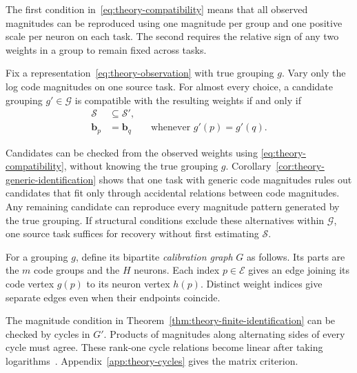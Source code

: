The first condition in~\eqref{eq:theory-compatibility} means that
all observed magnitudes can be reproduced using one magnitude per
group and one positive scale per neuron on each task. The second
requires the relative sign of any two weights in a group to remain
fixed across tasks.

\begin{corollary}
    \label{cor:theory-generic-identification}
    Fix a representation~\eqref{eq:theory-observation} with true
    grouping $g$. Vary only the log code magnitudes on
    one source task. For almost every choice, a candidate grouping
    $g'\in\mathcal G$ is compatible with the resulting weights
    if and only if
    \begin{equation*}
        \begin{aligned}
            \mathcal S&\subseteq\mathcal S',\\
            \mathbf b_p&=\mathbf b_q
                \qquad\text{whenever }g'(p)=g'(q).
        \end{aligned}
    \end{equation*}
\end{corollary}

Candidates can be checked from the observed weights using
\eqref{eq:theory-compatibility}, without knowing the true grouping
$g$. Corollary~\ref{cor:theory-generic-identification}
shows that one task with generic code magnitudes rules out
candidates that fit only through accidental relations between
code magnitudes. Any remaining candidate can reproduce every
magnitude pattern generated by the true grouping.
If structural conditions exclude these alternatives within
$\mathcal G$, one source task suffices for recovery without
first estimating $\mathcal S$.

For a grouping $g$, define its bipartite
\emph{calibration graph} $G$ as follows.
Its parts are the $m$ code groups and the $H$ neurons.
Each index $p\in\mathcal E$ gives an edge joining its code vertex
$g(p)$ to its neuron vertex $h(p)$.
Distinct weight indices give separate edges even when their endpoints
coincide.

The magnitude condition in Theorem~\ref{thm:theory-finite-identification}
can be checked by cycles in $G'$.
Products of magnitudes along alternating sides of every cycle must
agree. These rank-one cycle relations become linear
after taking logarithms~\cite[Theorem~34 and Remark~35]{kiraly2015algebraic}.
Appendix~\ref{app:theory-cycles} gives the matrix criterion.

